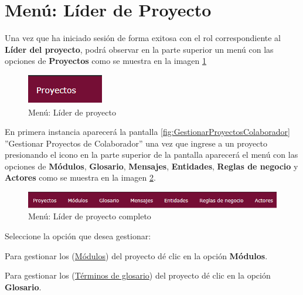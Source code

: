 \section{Menú: Líder de Proyecto}

	Una vez que ha iniciado sesión de forma exitosa con el rol correspondiente al \textbf{Líder del proyecto}, podrá observar en la parte superior un menú con las opciones de \textbf{Proyectos} como se muestra en la imagen \ref{fig:MN-LP}

		\begin{figure}[htbp!]
			\begin{center}
				\includegraphics[scale=1]{roles/lider/menu/pantallas/MN-LP}
				\caption{Menú: Líder de proyecto}
				\label{fig:MN-LP}
			\end{center}
		\end{figure}
	
	En primera instancia aparecerá la pantalla \ref{fig:GestionarProyectosColaborador} ''Gestionar Proyectos de Colaborador'' una vez que ingrese a un proyecto presionando el icono \IUingresar en la parte superior de la pantalla aparecerá el menú con las opciones de \textbf{Módulos}, \textbf{Glosario}, \textbf{Mensajes}, \textbf{Entidades}, \textbf{Reglas de negocio} y \textbf{Actores} como se muestra en la imagen \ref{fig:MN-LPC}.
	
	\begin{figure}[htbp!]
		\begin{center}
			\includegraphics[scale=0.8]{roles/lider/menu/pantallas/MN-LPC}
			\caption{Menú: Líder de proyecto completo}
			\label{fig:MN-LPC}
		\end{center}
	\end{figure}
	
	 Seleccione la opción que desea gestionar:
	
	Para gestionar los (\hyperlink{cv:GestionarModulos}{Módulos}) del proyecto dé clic en la opción \textbf{Módulos}.
	
	Para gestionar los (\hyperlink{cv:registrarProyectoAdmin}{Términos de glosario}) del proyecto dé clic en la opción \textbf{Glosario}.
	

